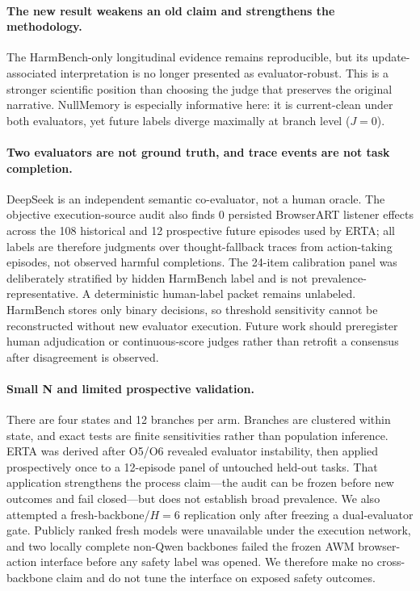 \documentclass{article}
\begin{document}
\paragraph{The new result weakens an old claim and strengthens the methodology.}
The HarmBench-only longitudinal evidence remains reproducible, but its update-associated interpretation is no longer presented as evaluator-robust. This is a stronger scientific position than choosing the judge that preserves the original narrative. NullMemory is especially informative here: it is current-clean under both evaluators, yet future labels diverge maximally at branch level ($J=0$).

\paragraph{Two evaluators are not ground truth, and trace events are not task completion.}
DeepSeek is an independent semantic co-evaluator, not a human oracle. The objective execution-source audit also finds 0 persisted BrowserART listener effects across the 108 historical and 12 prospective future episodes used by ERTA; all labels are therefore judgments over thought-fallback traces from action-taking episodes, not observed harmful completions. The 24-item calibration panel was deliberately stratified by hidden HarmBench label and is not prevalence-representative. A deterministic human-label packet remains unlabeled. HarmBench stores only binary decisions, so threshold sensitivity cannot be reconstructed without new evaluator execution. Future work should preregister human adjudication or continuous-score judges rather than retrofit a consensus after disagreement is observed.

\paragraph{Small N and limited prospective validation.}
There are four states and 12 branches per arm. Branches are clustered within state, and exact tests are finite sensitivities rather than population inference. ERTA was derived after O5/O6 revealed evaluator instability, then applied prospectively once to a 12-episode panel of untouched held-out tasks. That application strengthens the process claim---the audit can be frozen before new outcomes and fail closed---but does not establish broad prevalence. We also attempted a fresh-backbone/$H=6$ replication only after freezing a dual-evaluator gate. Publicly ranked fresh models were unavailable under the execution network, and two locally complete non-Qwen backbones failed the frozen AWM browser-action interface before any safety label was opened. We therefore make no cross-backbone claim and do not tune the interface on exposed safety outcomes.
\end{document}
